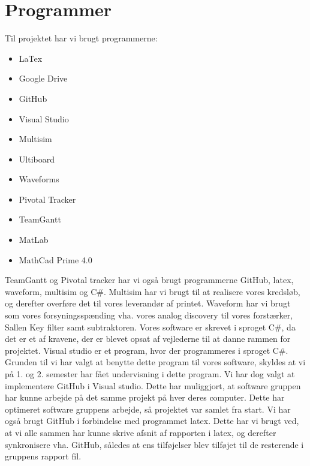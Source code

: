 \section{Programmer}

Til projektet har vi brugt programmerne: 

\begin{itemize}
	\item LaTex
	\item Google Drive
	\item GitHub
	\item Visual Studio
	\item Multisim
	\item Ultiboard
	\item Waveforms
	\item Pivotal Tracker
	\item TeamGantt
	\item MatLab
	\item MathCad Prime 4.0
\end{itemize}

TeamGantt og Pivotal tracker har vi også brugt programmerne GitHub, latex, waveform, multisim og C\#. Multisim har vi brugt til at realisere vores kredsløb, og derefter overføre det til vores leverandør af printet. Waveform har vi brugt som vores forsyningsspænding vha. vores analog discovery til vores forstærker, Sallen Key filter samt subtraktoren. Vores software er skrevet i sproget C\#, da det er et af kravene, der er blevet opsat af vejlederne til at danne rammen for projektet. Visual studio er et program, hvor der programmeres i sproget C\#. Grunden til vi har valgt at benytte dette program til vores software, skyldes at vi på 1. og 2. semester har fået undervisning i dette program. Vi har dog valgt at implementere GitHub i Visual studio. Dette har muliggjort, at software gruppen har kunne arbejde på det samme projekt på hver deres computer. Dette har optimeret software gruppens arbejde, så projektet var samlet fra start. Vi har også brugt GitHub i forbindelse med programmet latex. Dette har vi brugt ved, at vi alle sammen har kunne skrive afsnit af rapporten i latex, og derefter synkronisere vha. GitHub, således at ens tilføjelser blev tilføjet til de resterende i gruppens rapport fil.  
